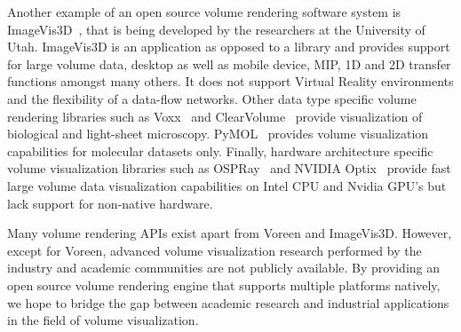 Another example of an open source volume rendering software system is
ImageVis3D~\citep{cibc_imagevis3D:_2016}, that is being developed by the
researchers at the University of Utah. ImageVis3D is an application as opposed
to a library and provides support for large volume data, desktop as well as
mobile device, MIP, 1D and 2D transfer functions amongst many others.  It does
not support Virtual Reality environments and the flexibility of a data-flow
networks. Other data type specific volume rendering libraries such as
Voxx~\citep{clendenon_voxx:_2002} and ClearVolume~\citep{royer_clearvolume:_2015}
provide visualization of biological and light-sheet microscopy.
PyMOL~\cite{schrodinger_llc_pymol_2015} provides volume visualization
capabilities for molecular datasets only. Finally, hardware architecture specific
volume visualization libraries such as OSPRay~\cite{wald_ospray_2017} and
NVIDIA\textsuperscript{\textregistered}
Optix\textsuperscript{\texttrademark}~\citep{parker_optix:_2010} provide fast
large volume data visualization capabilities on Intel CPU and Nvidia GPU's but
lack support for non-native hardware.

Many volume rendering APIs exist apart from Voreen and ImageVis3D. However,
except for Voreen, advanced volume visualization research performed by the
industry and academic communities are not publicly available. By providing an
open source volume rendering engine that supports multiple platforms natively,
we hope to bridge the gap between academic research and industrial applications
in the field of volume visualization.
